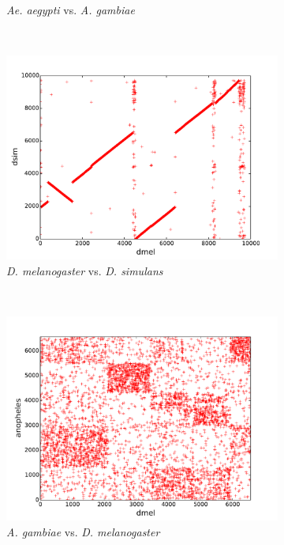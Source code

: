 \begin{figure}[H]
\begin{subfigure}[b]{0.45\textwidth}
    \caption{\emph{Ae. aegypti} vs. \emph{A. gambiae}}
    \label{fig:synteny-dotplots-mosquitoes}
  \end{subfigure}
  ~
  \begin{subfigure}[b]{0.45\textwidth}
    \includegraphics[width=\textwidth]{figures/synteny/dmel_dsim_plot}
    \caption{\emph{D. melanogaster} vs. \emph{D. simulans}}
    \label{fig:synteny-dotplots-drosophila}
  \end{subfigure}
  ~
  \begin{subfigure}[b]{0.45\textwidth}
    \includegraphics[width=\textwidth]{figures/synteny/dmel_anopheles_plot}
    \caption{\emph{A. gambiae} vs. \emph{D. melanogaster}}
    \label{fig:synteny-dotplots-anopheles-drosophila}
  \end{subfigure}
\label{fig:dot-plots}
\caption{}
\end{figure}

